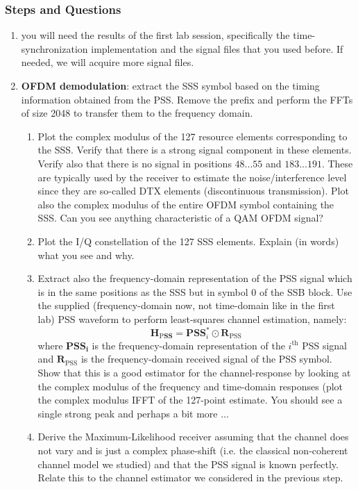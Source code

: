 \documentclass[a4paper,10pt]{article}
\begin{document}
\subsubsection{Steps and Questions}
\begin{enumerate}
\item you will need the results of the first lab session, specifically the time-synchronization implementation and the signal files that you used before. If needed, we will acquire more signal files.
\item {\bf OFDM demodulation}: extract the SSS symbol based on the timing information obtained from the PSS.  Remove the prefix and perform the FFTs of size 2048 to transfer them to the frequency domain.  
\begin{enumerate}
\item Plot the complex modulus of the 127 resource elements corresponding to the SSS.  Verify that there is a strong signal component in these elements. Verify also that there is no signal in positions $48...55$ and $183...191$.  These are typically used by the receiver to estimate the noise/interference level since they are so-called DTX elements (discontinuous transmission).  Plot also the complex modulus of the entire OFDM symbol containing the SSS.  Can you see anything characteristic of a QAM OFDM signal?
\item Plot the I/Q constellation of the 127 SSS elements.  Explain (in words) what you see and why.
\item Extract also the frequency-domain representation of the PSS signal which is in the same positions as the SSS but in symbol 0 of the SSB block.  Use the supplied (frequency-domain now, not time-domain like in the first lab) PSS waveform to perform least-squares channel estimation, namely:
\begin{equation}
\mathbf{H_{\mathrm PSS}} = \mathbf{PSS}_i^* \odot {\mathbf R}_{\mathrm{PSS}}
\end{equation}
where $\mathbf{PSS_i}$ is the frequency-domain representation of the $i^{\mathrm{th}}$ PSS signal and ${\mathbf R}_{\mathrm{PSS}}$ is the frequency-domain received signal of the PSS symbol.  Show that this is a good estimator for the channel-response by looking at the complex modulus of the frequency and time-domain responses (plot the complex modulus IFFT of the 127-point estimate.  You should see a single strong peak and perhaps a bit more ...
\item Derive the Maximum-Likelihood receiver assuming that the channel does not vary and is just a complex phase-shift (i.e. the classical non-coherent channel model we studied) and that the PSS signal is known perfectly. Relate this to the channel estimator we considered in the previous step.

\end{enumerate}
\end{enumerate}
\end{document}
